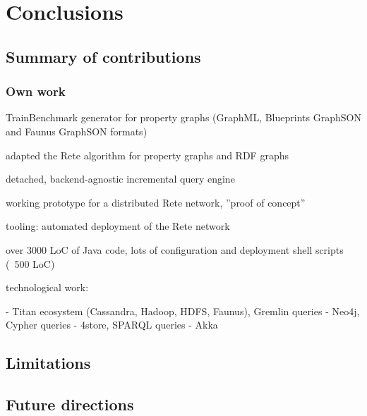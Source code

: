 \chapter{Conclusions}
\label{chap:conclusions}

\section{Summary of contributions}

\subsection{Own work}

TrainBenchmark generator for property graphs (GraphML, Blueprints GraphSON and Faunus GraphSON formats)

adapted the Rete algorithm for property graphs and RDF graphs

detached, backend-agnostic incremental query engine 

working prototype for a distributed Rete network, ''proof of concept''

tooling: automated deployment of the Rete network

over 3000 LoC of Java code, lots of configuration and deployment shell scripts (~500 LoC)

technological work:

- Titan ecosystem (Cassandra, Hadoop, HDFS, Faunus), Gremlin queries
- Neo4j, Cypher queries
- 4store, SPARQL queries
- Akka 


\section{Limitations}

\section{Future directions}

